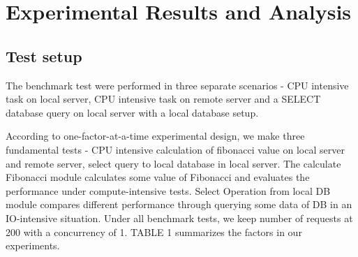 \documentclass[../thesis.tex]{subfiles}
\begin{document}
\section{Experimental Results and Analysis}
\subsection{Test setup}
The benchmark test were performed in three separate scenarios - CPU intensive task on local server, CPU intensive task on remote server and a SELECT database query on local server with a local database setup.
\newline
	
According to one-factor-at-a-time experimental design, we make three fundamental tests - CPU intensive calculation of fibonacci value on local server and remote server, select query to local database in local server. The calculate Fibonacci module calculates some value of Fibonacci and evaluates the performance under compute-intensive tests. Select Operation from local DB module compares different performance through querying some data of DB in an IO-intensive situation. Under all benchmark tests, we keep number of requests at 200 with a concurrency of 1. TABLE 1 summarizes the factors in our experiments.
	
\end{document}

